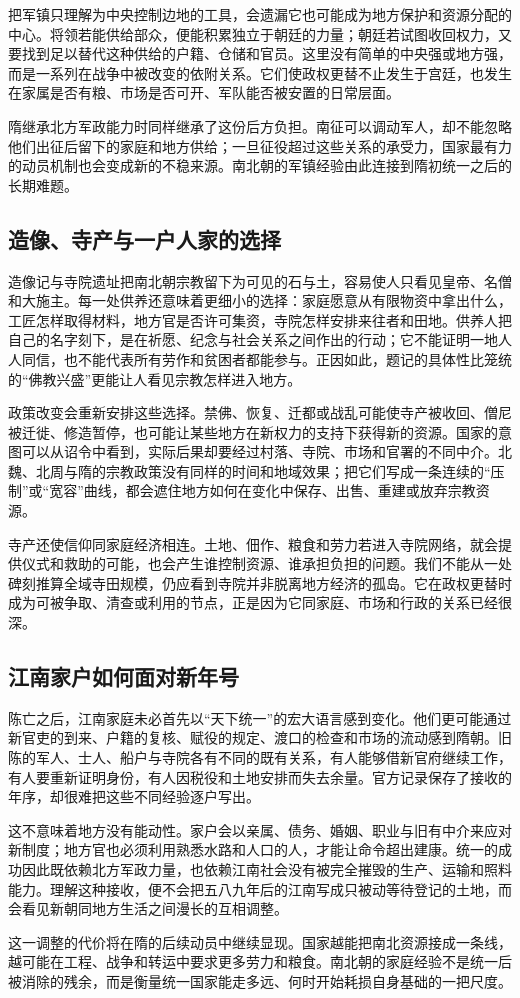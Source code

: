 把军镇只理解为中央控制边地的工具，会遗漏它也可能成为地方保护和资源分配的中心。将领若能供给部众，便能积累独立于朝廷的力量；朝廷若试图收回权力，又要找到足以替代这种供给的户籍、仓储和官员。这里没有简单的中央强或地方强，而是一系列在战争中被改变的依附关系。它们使政权更替不止发生于宫廷，也发生在家属是否有粮、市场是否可开、军队能否被安置的日常层面。

隋继承北方军政能力时同样继承了这份后方负担。南征可以调动军人，却不能忽略他们出征后留下的家庭和地方供给；一旦征役超过这些关系的承受力，国家最有力的动员机制也会变成新的不稳来源。南北朝的军镇经验由此连接到隋初统一之后的长期难题。

\subsection{造像、寺产与一户人家的选择}

造像记与寺院遗址把南北朝宗教留下为可见的石与土，容易使人只看见皇帝、名僧和大施主。每一处供养还意味着更细小的选择：家庭愿意从有限物资中拿出什么，工匠怎样取得材料，地方官是否许可集资，寺院怎样安排来往者和田地。供养人把自己的名字刻下，是在祈愿、纪念与社会关系之间作出的行动；它不能证明一地人人同信，也不能代表所有劳作和贫困者都能参与。正因如此，题记的具体性比笼统的“佛教兴盛”更能让人看见宗教怎样进入地方。

政策改变会重新安排这些选择。禁佛、恢复、迁都或战乱可能使寺产被收回、僧尼被迁徙、修造暂停，也可能让某些地方在新权力的支持下获得新的资源。国家的意图可以从诏令中看到，实际后果却要经过村落、寺院、市场和官署的不同中介。北魏、北周与隋的宗教政策没有同样的时间和地域效果；把它们写成一条连续的“压制”或“宽容”曲线，都会遮住地方如何在变化中保存、出售、重建或放弃宗教资源。

寺产还使信仰同家庭经济相连。土地、佃作、粮食和劳力若进入寺院网络，就会提供仪式和救助的可能，也会产生谁控制资源、谁承担负担的问题。我们不能从一处碑刻推算全域寺田规模，仍应看到寺院并非脱离地方经济的孤岛。它在政权更替时成为可被争取、清查或利用的节点，正是因为它同家庭、市场和行政的关系已经很深。

\subsection{江南家户如何面对新年号}

陈亡之后，江南家庭未必首先以“天下统一”的宏大语言感到变化。他们更可能通过新官吏的到来、户籍的复核、赋役的规定、渡口的检查和市场的流动感到隋朝。旧陈的军人、士人、船户与寺院各有不同的既有关系，有人能够借新官府继续工作，有人要重新证明身份，有人因税役和土地安排而失去余量。官方记录保存了接收的年序，却很难把这些不同经验逐户写出。

这不意味着地方没有能动性。家户会以亲属、债务、婚姻、职业与旧有中介来应对新制度；地方官也必须利用熟悉水路和人口的人，才能让命令超出建康。统一的成功因此既依赖北方军政力量，也依赖江南社会没有被完全摧毁的生产、运输和照料能力。理解这种接收，便不会把五八九年后的江南写成只被动等待登记的土地，而会看见新朝同地方生活之间漫长的互相调整。

这一调整的代价将在隋的后续动员中继续显现。国家越能把南北资源接成一条线，越可能在工程、战争和转运中要求更多劳力和粮食。南北朝的家庭经验不是统一后被消除的残余，而是衡量统一国家能走多远、何时开始耗损自身基础的一把尺度。